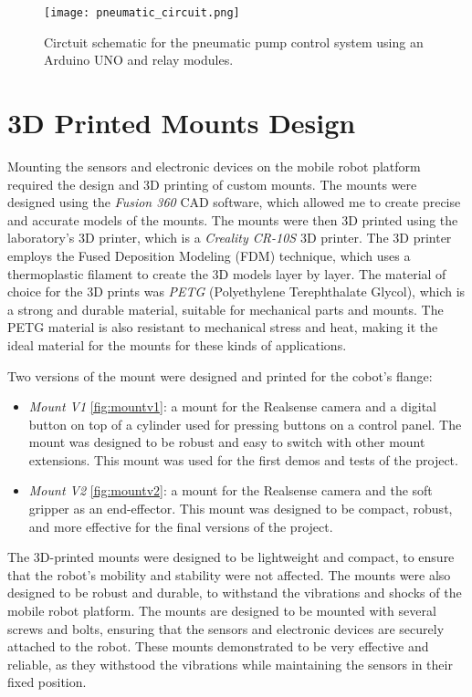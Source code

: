 \begin{figure}[t]
    \centering
    \texttt{[image: pneumatic\_circuit.png]}
    \captionsetup{width=1\linewidth}
    \caption{Circtuit schematic for the pneumatic pump control system using an Arduino UNO and relay modules.}
    \label{fig:pneumatic_circuit}
\end{figure}

\section{3D Printed Mounts Design}

Mounting the sensors and electronic devices on the mobile robot platform required the design and 3D printing
of custom mounts. The mounts were designed using the \textit{Fusion 360} CAD software, which allowed me to create
precise and accurate models of the mounts. The mounts were then 3D printed using the laboratory's 3D printer,
which is a \textit{Creality CR-10S} 3D printer. The 3D printer employs the Fused Deposition Modeling (FDM) technique,
which uses a thermoplastic filament to create the 3D models layer by layer. The material of choice
for the 3D prints was \textit{PETG} (Polyethylene Terephthalate Glycol), which is a strong and durable material,
suitable for mechanical parts and mounts. The PETG material is also resistant to mechanical stress and heat,
making it the ideal material for the mounts for these kinds of applications.

Two versions of the mount were designed and printed for the cobot's flange:

\begin{itemize}
    \item \textit{Mount V1} \ref{fig:mountv1}: a mount for the Realsense camera and a digital button on top of a cylinder used
    for pressing buttons on a control panel. The mount was designed to be robust and easy to switch with other
    mount extensions. This mount was used for the first demos and tests of the project.
    \item \textit{Mount V2} \ref{fig:mountv2}: a mount for the Realsense camera and the soft gripper as an end-effector.
    This mount was designed to be compact, robust, and more effective for the final versions of the project.
\end{itemize}

The 3D-printed mounts were designed to be lightweight and compact, to ensure that the robot's mobility and stability
were not affected. The mounts were also designed to be robust and durable, to withstand the vibrations and shocks
of the mobile robot platform. The mounts are designed to be
mounted with several screws and bolts, ensuring that the sensors and electronic devices are securely attached to the robot.
These mounts demonstrated to be very effective and reliable, as they withstood the vibrations while maintaining
the sensors in their fixed position.


